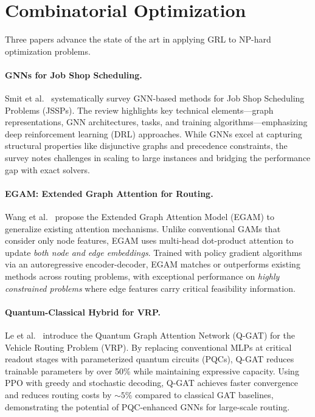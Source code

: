 \documentclass{article}
\begin{document}
\section{Combinatorial Optimization}
\label{sec:co}

Three papers advance the state of the art in applying GRL to NP-hard optimization problems.

\paragraph{GNNs for Job Shop Scheduling.}
Smit et al.~\cite{zhang2024jsp} systematically survey GNN-based methods for Job Shop Scheduling Problems (JSSPs). The review highlights key technical elements---graph representations, GNN architectures, tasks, and training algorithms---emphasizing deep reinforcement learning (DRL) approaches. While GNNs excel at capturing structural properties like disjunctive graphs and precedence constraints, the survey notes challenges in scaling to large instances and bridging the performance gap with exact solvers.

\paragraph{EGAM: Extended Graph Attention for Routing.}
Wang et al.~\cite{egam2026} propose the Extended Graph Attention Model (EGAM) to generalize existing attention mechanisms. Unlike conventional GAMs that consider only node features, EGAM uses multi-head dot-product attention to update \textit{both node and edge embeddings}. Trained with policy gradient algorithms via an autoregressive encoder-decoder, EGAM matches or outperforms existing methods across routing problems, with exceptional performance on \textit{highly constrained problems} where edge features carry critical feasibility information.

\paragraph{Quantum-Classical Hybrid for VRP.}
Le et al.~\cite{qgat2025} introduce the Quantum Graph Attention Network (Q-GAT) for the Vehicle Routing Problem (VRP). By replacing conventional MLPs at critical readout stages with parameterized quantum circuits (PQCs), Q-GAT reduces trainable parameters by over 50\% while maintaining expressive capacity. Using PPO with greedy and stochastic decoding, Q-GAT achieves faster convergence and reduces routing costs by ${\sim}5\%$ compared to classical GAT baselines, demonstrating the potential of PQC-enhanced GNNs for large-scale routing.
\end{document}
